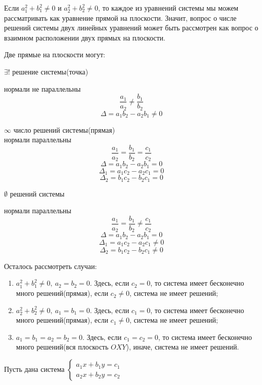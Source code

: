 \documentclass{article}
\begin{document}
    Если \(a_1^2 + b_1^2 \not = 0\) и \(a_2^2 + b_2^2 \not = 0\), то каждое из уравнений системы мы можем рассматривать как уравнение прямой на плоскости.
    Значит, вопрос о числе решений системы двух линейных уравнений может быть рассмотрен как вопрос о взаимном расположении двух прямых на плоскости.

    Две прямые на плоскости могут:


    \begin{multicols}{3}
        \(\exists!\) решение системы(точка)

        нормали не параллельны
        \[\frac{a_1}{a_2} \not = \frac{b_1}{b_2}\]
        \[\Delta = a_1b_2 - a_2b_1 \not = 0\]
        \columnbreak

        \(\infty\) число решений системы(прямая)\\
        нормали параллельны
        \[\frac{a_1}{a_2} = \frac{b_1}{b_2} = \frac{c_1}{c_2}\]
        \[\Delta = a_1b_2 - a_2b_1 = 0\]
        \[\Delta_1 = a_1c_2 - a_2c_1 = 0\]
        \[\Delta_2 = b_1c_2 - b_2c_1 = 0\]
        \columnbreak

        \(\emptyset\) решений системы

        нормали параллельны
        \[\frac{a_1}{a_2} = \frac{b_1}{b_2} \not = \frac{c_1}{c_2}\]
        \[\Delta = a_1b_2 - a_2b_1 = 0\]
        \[\Delta_1 = a_1c_2 - a_2c_1 \not = 0\]
        \[\Delta_2 = b_1c_2 - b_2c_1 \not = 0\]
    \end{multicols}

    Осталось рассмотреть случаи:
    \begin{enumerate}
        \item \(a_1^2 + b_1^2 \not = 0,\ a_2 = b_2 = 0\). Здесь, если \(c_2 = 0\), то система имеет бесконечно много решений(прямая), если \(c_2 \not = 0\), система не имеет решений;
        \item \(a_2^2 + b_2^2 \not = 0,\ a_1 = b_1 = 0\). Здесь, если \(c_1 = 0\), то система имеет бесконечно много решений(прямая), если \(c_1 \not = 0\), система не имеет решений;
        \item \(a_1 = b_1 = a_2 = b_2 = 0\). Здесь, если \(c_1 = c_2 = 0\), то система имеет бесконечно много решений(вся плоскость \(OXY\)), иначе, система не имеет решений.
    \end{enumerate}

    Пусть дана система \(\begin{cases} a_1x + b_1y = c_1\\ a_2x + b_2y = c_2 \end{cases}\)
\end{document}
